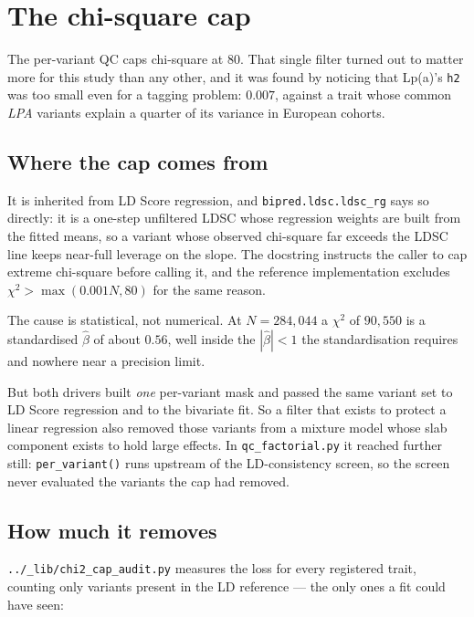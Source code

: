 \section*{The chi-square cap}

The per-variant QC caps chi-square at 80. That single filter turned out to
matter more for this study than any other, and it was found by noticing that
Lp(a)'s \texttt{h2} was too small even for a tagging problem: $0.007$, against a
trait whose common \emph{LPA} variants explain a quarter of its variance in
European cohorts.

\subsection*{Where the cap comes from}

It is inherited from LD Score regression, and \texttt{bipred.ldsc.ldsc\_rg} says
so directly: it is a one-step unfiltered LDSC whose regression weights are built
from the fitted means, so a variant whose observed chi-square far exceeds the
LDSC line keeps near-full leverage on the slope. The docstring instructs the
caller to cap extreme chi-square before calling it, and the reference
implementation excludes $\chi^2 > \max(0.001N, 80)$ for the same reason.

The cause is statistical, not numerical. At $N = 284{,}044$ a $\chi^2$ of
$90{,}550$ is a standardised $\hat\beta$ of about $0.56$, well inside the
$|\hat\beta| < 1$ the standardisation requires and nowhere near a precision
limit.

But both drivers built \emph{one} per-variant mask and passed the same variant
set to LD Score regression and to the bivariate fit. So a filter that exists to
protect a linear regression also removed those variants from a mixture model
whose slab component exists to hold large effects. In
\texttt{qc\_factorial.py} it reached further still: \texttt{per\_variant()}
runs upstream of the LD-consistency screen, so the screen never evaluated the
variants the cap had removed.

\subsection*{How much it removes}

\texttt{../\_lib/chi2\_cap\_audit.py} measures the loss for every registered
trait, counting only variants present in the LD reference --- the only ones a
fit could have seen:

